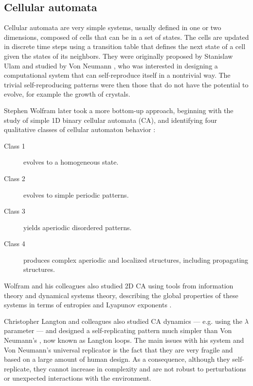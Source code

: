 \subsection{Cellular automata}

Cellular automata are very simple systems, usually defined in one or two
dimensions, composed of cells that can be in a set of states. The cells are
updated in discrete time steps using a transition table that defines the next
state of a cell given the states of its neighbors. They were originally proposed
by Stanislaw Ulam and studied by Von Neumann
\parencite{vonneumannTheorySelfreproducingAutomata1966}, who was interested in
designing a computational system that can self-reproduce itself in a nontrivial
way. The trivial self-reproducing patterns were then those that do not have the
potential to evolve, for example the growth of crystals.

Stephen Wolfram later took a more bottom-up approach, beginning with the study
of simple 1D binary cellular automata (CA), and identifying four qualitative
classes of cellular automaton behavior
\parencite{wolframUniversalityComplexityCellular1984}:

\begin{description}
\item[Class 1] evolves to a homogeneous state.
\item[Class 2] evolves to simple periodic patterns.
\item[Class 3] yields aperiodic disordered patterns.
\item[Class 4] produces complex aperiodic and localized structures, including
  propagating structures.
\end{description}

Wolfram and his colleagues also studied 2D CA using tools from information
theory and dynamical systems theory, describing the global properties of these
systems in terms of entropies and Lyapunov exponents
\parencite{packardTwodimensionalCellularAutomata1985}.

Christopher Langton and colleagues also studied CA dynamics
\parencite{liTransitionPhenomenaCellular1990} --- e.g. using the $\lambda$ parameter
\parencite{langtonComputationEdgeChaos1990} --- and designed a self-replicating
pattern much simpler than Von Neumann's
\parencite{langtonSelfreproductionCellularAutomata1984}, now known as Langton
loops. The main issues with his system and Von Neumann's universal replicator is
the fact that they are very fragile and based on a large amount of human design.
As a consequence, although they self-replicate, they cannot increase in
complexity and are not robust to perturbations or unexpected interactions with
the environment.

